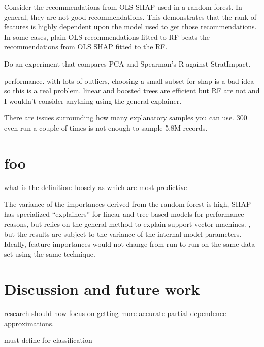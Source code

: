\documentclass[12pt]{article}
\newcommand{\todo}[1]{{{\color{red}{[#1]}}}}
\begin{document}
Consider the recommendations from OLS SHAP used in a random forest. In general, they are not good recommendations. This demonstrates that the rank of features is highly dependent upon the model used to get those recommendations. In some cases, plain OLS recommendations fitted to RF beats the recommendations from OLS SHAP fitted to the RF.

Do an experiment that compares PCA and Spearman's R against StratImpact.

performance. with lots of outliers, choosing a small subset for shap is a bad idea so this is a real problem. linear and boosted trees are efficient but RF are not and I wouldn't consider anything using the general explainer.

There are issues surrounding how many explanatory samples you can use. 300 even run a couple of times is not enough to sample 5.8M records.

\todo{We need min samples per x to avoid left edge issues as they skew entire pdp, which severely skews mass AUC.}

\todo{explain cat mechanism and how there is no left/right edge so no evidence used to weight AUC.}
 
\section{foo}

 what is the definition: loosely as which are most predictive

The variance of the importances derived from the random forest is high, SHAP has specialized ``explainers'' for linear and tree-based models for performance reasons, but relies on the general method to explain support vector machines. , but the results are subject to the variance of the internal model parameters.  Ideally, feature importances would not change from run to run on the same data set using the same technique.

\section{Discussion and future work}

research should now focus on getting more accurate partial dependence approximations.

must define for classification




\end{document}
